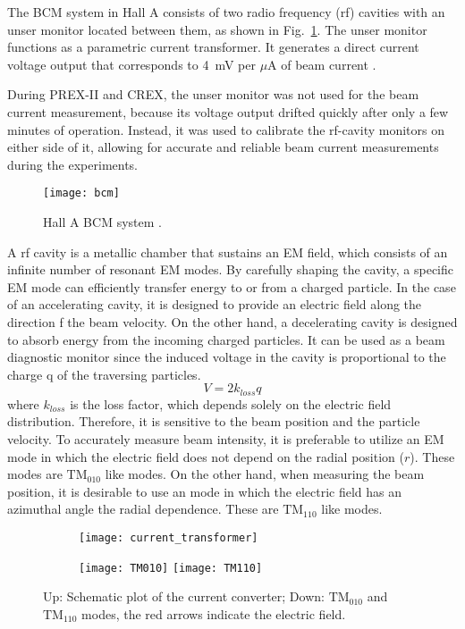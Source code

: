 The BCM system in Hall A consists of two radio frequency (rf) cavities with
an unser monitor located between them, as shown in Fig.~\ref{fig:BCMs}. 
The unser monitor functions as a parametric current transformer. 
It generates a direct current voltage output that corresponds to 4~mV per $\mu$A of beam 
current \cite{987367}.

During PREX-II and CREX, the unser monitor was not used for the beam current measurement,
because its voltage output drifted quickly after only a few minutes of operation.
Instead, it was used to calibrate the rf-cavity monitors on either side of it,
allowing for accurate and reliable beam current measurements during the experiments.
\begin{figure}[!h]
    \centering
    \texttt{[image: bcm]}
    \caption{Hall A BCM system \cite{987367}.}
    \label{fig:BCMs}
\end{figure}

A rf cavity is a metallic chamber that sustains an EM field, which consists of
an infinite number of resonant EM modes. By carefully shaping the cavity, a specific
EM mode can efficiently transfer energy to or from a charged particle. In the case 
of an accelerating cavity, it is designed to provide an electric field along the
direction f the beam velocity. On the other hand, a decelerating cavity is designed
to absorb energy from the incoming charged particles. It can be used as a beam diagnostic monitor
since the induced voltage in the cavity is proportional to the charge q of the 
traversing particles.
\begin{equation}
    V = 2k_{loss} q
\end{equation}
where $k_{loss}$ is the loss factor, which depends solely on the electric field
distribution. Therefore, it is sensitive to the beam position and the particle velocity.
To accurately measure beam intensity, it is preferable to utilize an EM mode 
in which the electric field does not depend on the radial position ($r$). These 
modes are $\text{TM}_{\text{010}}$ like modes.
On the other hand, when measuring the beam position, it is desirable to use an
mode in which the electric field has an azimuthal angle the radial dependence. 
These are $\text{TM}_{\text{110}}$ like modes.
\begin{figure}[!h]
    \centering
    \begin{subfigure}[c]{0.5\textwidth}
	\texttt{[image: current\_transformer]}
    \end{subfigure}
    \begin{subfigure}[c]{0.55\textwidth}
	\texttt{[image: TM010]}
	\texttt{[image: TM110]}
    \end{subfigure}
    \caption{Up: Schematic plot of the current converter; 
    Down: $\text{TM}_{010}$ and $\text{TM}_{110}$ modes, the red arrows indicate the electric field.}
\end{figure}

